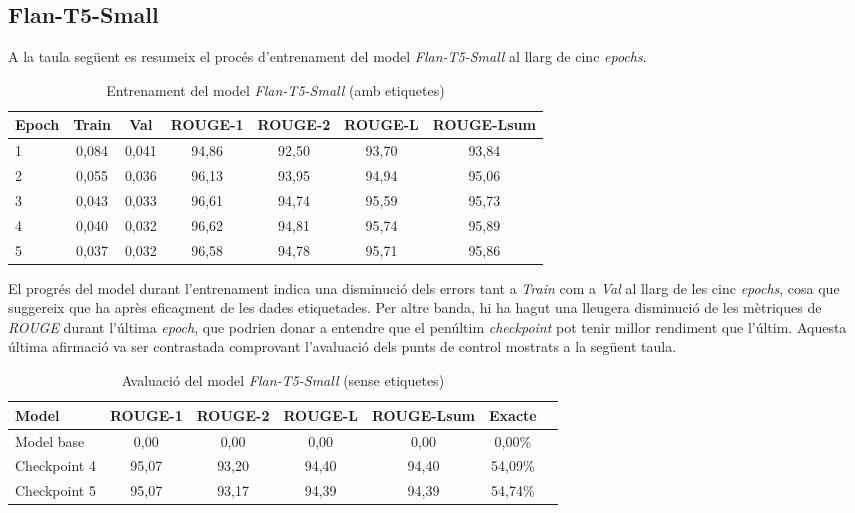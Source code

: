 \subsection{Flan-T5-Small}
A la taula següent es resumeix el procés d'entrenament del model \textit{Flan-T5-Small} al llarg de cinc \textit{epochs}.
\begin{table}[H]
    \centering
    \begin{tabular}{lcccccc}
    \toprule
    Epoch & Train & Val & ROUGE-1 & ROUGE-2 & ROUGE-L & ROUGE-Lsum \\
    \midrule
    1 & 0,084 & 0,041 & 94,86 & 92,50 & 93,70 & 93,84 \\
    2 & 0,055 & 0,036 & 96,13 & 93,95 & 94,94 & 95,06 \\
    3 & 0,043 & 0,033 & 96,61 & 94,74 & 95,59 & 95,73 \\
    4 & 0,040 & 0,032 & 96,62 & 94,81 & 95,74 & 95,89 \\
    5 & 0,037 & 0,032 & 96,58 & 94,78 & 95,71 & 95,86 \\
    \bottomrule
    \end{tabular}
    \caption[Entrenament del model \textit{Flan-T5-Small}]{Entrenament del model \textit{Flan-T5-Small} (amb etiquetes)}
\end{table}
El progrés del model durant l'entrenament indica una disminució dels errors tant a \textit{Train} com a \textit{Val} al llarg de les cinc \textit{epochs}, cosa que suggereix que ha après eficaçment de les dades etiquetades. Per altre banda, hi ha hagut una lleugera disminució de les mètriques de \textit{ROUGE} durant l'última \textit{epoch}, que podrien donar a entendre que el penúltim \textit{checkpoint} pot tenir millor rendiment que l'últim. Aquesta última afirmació va ser contrastada comprovant l'avaluació dels punts de control mostrats a la següent taula. 

\begin{table}[H]
    \centering
    \begin{tabular}{lcccccc}
    \toprule
    Model & ROUGE-1 & ROUGE-2 & ROUGE-L & ROUGE-Lsum & Exacte \\
    \midrule
    Model base   & 0,00  & 0,00  & 0,00  & 0,00  & 0,00\% \\
    Checkpoint 4 & 95,07 & 93,20 & 94,40 & 94,40 & 54,09\% \\
    Checkpoint 5 & 95,07 & 93,17 & 94,39 & 94,39 & 54,74\% \\
    \bottomrule
    \end{tabular}
    \caption[Avaluació del model \textit{Flan-T5-Small}]{Avaluació del model \textit{Flan-T5-Small} (sense etiquetes)}
\end{table}

